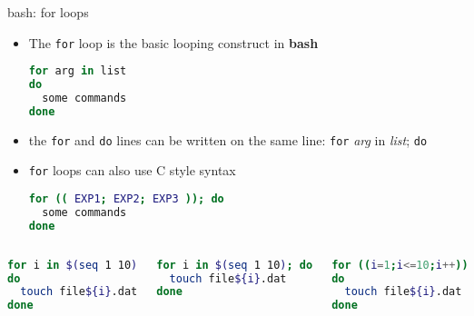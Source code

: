 \documentclass[10pt,t]{beamer}
\begin{document}
\begin{frame}[fragile]{bash: for loops}
  \begin{exampleblock}{}
    \begin{itemize}
      \item The \texttt{for} loop is the basic looping construct in \textbf{bash}
      \begin{lstlisting}[language=bash]
for arg in list
do
  some commands
done
      \end{lstlisting}
      \item the \texttt{for} and \texttt{do} lines can be written on the same line: \texttt{for} \textit{arg} in \textit{list}; \texttt{do}
      \item \texttt{for} loops can also use C style syntax
      \begin{lstlisting}[language=bash]
for (( EXP1; EXP2; EXP3 )); do
  some commands
done
      \end{lstlisting}
    \end{itemize}
  \end{exampleblock}
  \begin{columns}
    \begin{exampleblock}{}
      \begin{lstlisting}[language=bash]
for i in $(seq 1 10)
do
  touch file${i}.dat
done
      \end{lstlisting}
    \end{exampleblock}
    \begin{exampleblock}{}
      \begin{lstlisting}[language=bash]
for i in $(seq 1 10); do
  touch file${i}.dat
done
      \end{lstlisting}
    \end{exampleblock}
    \begin{exampleblock}{}
      \begin{lstlisting}[language=bash]
for ((i=1;i<=10;i++))
do
  touch file${i}.dat
done
      \end{lstlisting}
    \end{exampleblock}
  \end{columns}
\end{frame}
\end{document}

